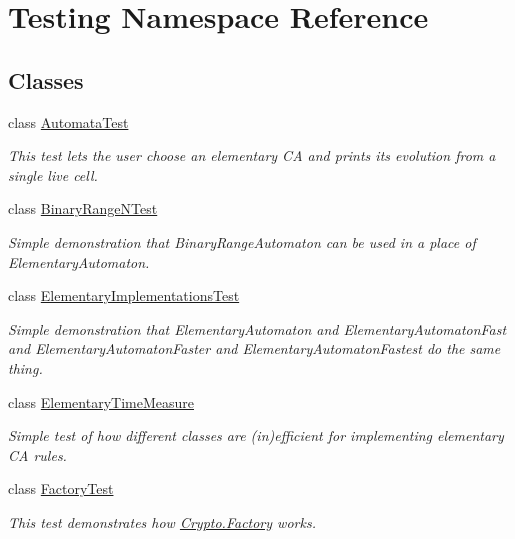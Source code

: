 \hypertarget{namespace_testing}{}\section{Testing Namespace Reference}
\label{namespace_testing}
\subsection*{Classes}
\begin{DoxyCompactItemize}
\item 
class \hyperlink{class_testing_1_1_automata_test}{Automata\+Test}
\begin{DoxyCompactList}\small\item\em This test lets the user choose an elementary C\+A and prints its evolution from a single live cell. \end{DoxyCompactList}\item 
class \hyperlink{class_testing_1_1_binary_range_n_test}{Binary\+Range\+N\+Test}
\begin{DoxyCompactList}\small\item\em Simple demonstration that {\ttfamily Binary\+Range\+Automaton} can be used in a place of {\ttfamily Elementary\+Automaton}. \end{DoxyCompactList}\item 
class \hyperlink{class_testing_1_1_elementary_implementations_test}{Elementary\+Implementations\+Test}
\begin{DoxyCompactList}\small\item\em Simple demonstration that {\ttfamily Elementary\+Automaton} and {\ttfamily Elementary\+Automaton\+Fast} and {\ttfamily Elementary\+Automaton\+Faster} and {\ttfamily Elementary\+Automaton\+Fastest} do the same thing. \end{DoxyCompactList}\item 
class \hyperlink{class_testing_1_1_elementary_time_measure}{Elementary\+Time\+Measure}
\begin{DoxyCompactList}\small\item\em Simple test of how different classes are (in)efficient for implementing elementary C\+A rules. \end{DoxyCompactList}\item 
class \hyperlink{class_testing_1_1_factory_test}{Factory\+Test}
\begin{DoxyCompactList}\small\item\em This test demonstrates how {\ttfamily \hyperlink{class_crypto_1_1_factory}{Crypto.\+Factory}} works. \end{DoxyCompactList}\item 

\end{DoxyCompactItemize}
